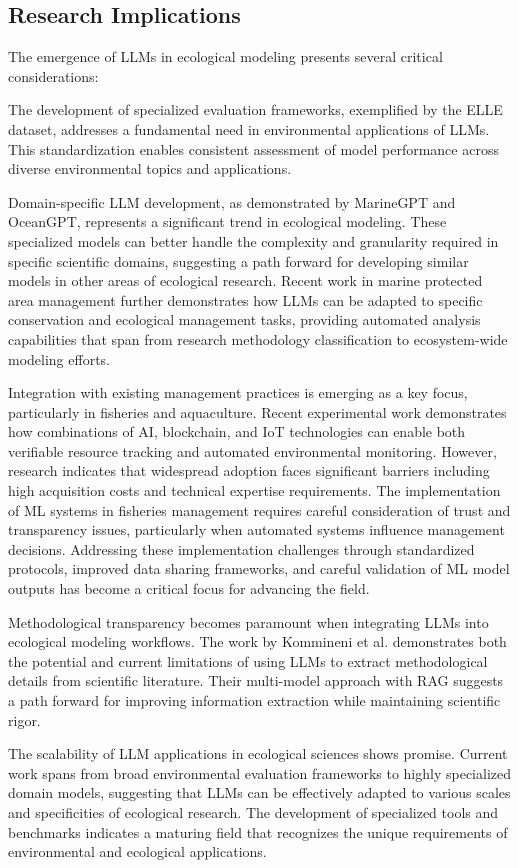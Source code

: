 \subsection*{Research Implications}

The emergence of LLMs in ecological modeling presents several critical considerations:

The development of specialized evaluation frameworks, exemplified by the ELLE dataset, addresses a fundamental need in environmental applications of LLMs. This standardization enables consistent assessment of model performance across diverse environmental topics and applications.

Domain-specific LLM development, as demonstrated by MarineGPT and OceanGPT, represents a significant trend in ecological modeling. These specialized models can better handle the complexity and granularity required in specific scientific domains, suggesting a path forward for developing similar models in other areas of ecological research. Recent work in marine protected area management further demonstrates how LLMs can be adapted to specific conservation and ecological management tasks, providing automated analysis capabilities that span from research methodology classification to ecosystem-wide modeling efforts.

Integration with existing management practices is emerging as a key focus, particularly in fisheries and aquaculture. Recent experimental work demonstrates how combinations of AI, blockchain, and IoT technologies can enable both verifiable resource tracking and automated environmental monitoring. However, research indicates that widespread adoption faces significant barriers including high acquisition costs and technical expertise requirements. The implementation of ML systems in fisheries management requires careful consideration of trust and transparency issues, particularly when automated systems influence management decisions. Addressing these implementation challenges through standardized protocols, improved data sharing frameworks, and careful validation of ML model outputs has become a critical focus for advancing the field.

Methodological transparency becomes paramount when integrating LLMs into ecological modeling workflows. The work by Kommineni et al. demonstrates both the potential and current limitations of using LLMs to extract methodological details from scientific literature. Their multi-model approach with RAG suggests a path forward for improving information extraction while maintaining scientific rigor.

The scalability of LLM applications in ecological sciences shows promise. Current work spans from broad environmental evaluation frameworks to highly specialized domain models, suggesting that LLMs can be effectively adapted to various scales and specificities of ecological research. The development of specialized tools and benchmarks indicates a maturing field that recognizes the unique requirements of environmental and ecological applications.
